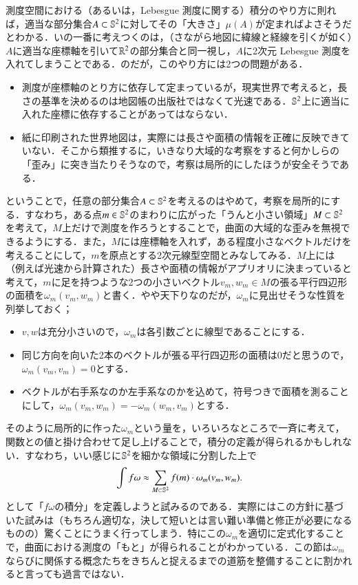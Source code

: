 測度空間における（あるいは，Lebesgue 測度に関する）積分のやり方に則れば，適当な部分集合$A \subset \mathbb{S}^2$に対してその「大きさ」$\mu(A)$が定まればよさそうだとわかる．いの一番に考えつくのは，（さながら地図に緯線と経線を引くが如く）$A$に適当な座標軸を引いて$\mathbb{R}^2$の部分集合と同一視し，$A$に2次元 Lebesgue 測度を入れてしまうことである．のだが，このやり方には2つの問題がある．
\begin{itemize}
\item 測度が座標軸のとり方に依存して定まっているが，現実世界で考えると，長さの基準を決めるのは地図帳の出版社ではなくて光速である．$\mathbb{S}^2$上に適当に入れた座標に依存することがあってはならない．
\item 紙に印刷された世界地図は，実際には長さや面積の情報を正確に反映できていない．そこから類推するに，いきなり大域的な考察をすると何かしらの「歪み」に突き当たりそうなので，考察は局所的にしたほうが安全そうである．
\end{itemize}
ということで，任意の部分集合$A \subset \mathbb{S}^2$を考えるのはやめて，考察を局所的にする．すなわち，ある点$m \in \mathbb{S}^2$のまわりに広がった「うんと小さい領域」$M \subset \mathbb{S}^2$を考えて，$M$上だけで測度を作ろうとすることで，曲面の大域的な歪みを無視できるようにする．また，$M$には座標軸を入れず，ある程度小さなベクトルだけを考えることにして，$m$を原点とする2次元線型空間とみなしてみる．$M$上には（例えば光速から計算された）長さや面積の情報がアプリオリに決まっていると考えて，$m$に足を持つような2つの小さいベクトル$v_m, w_m \in M$の張る平行四辺形の面積を$\omega_m(v_m,w_m)$と書く．やや天下りなのだが，$\omega_m$に見出せそうな性質を列挙しておく；
\begin{itemize}
\item $v,w$は充分小さいので，$\omega_m$は各引数ごとに線型であることにする．
\item 同じ方向を向いた2本のベクトルが張る平行四辺形の面積は0だと思うので，$\omega_m(v_m,v_m) = 0$とする．
\item ベクトルが右手系なのか左手系なのかを込めて，符号つきで面積を測ることにして，$\omega_m(v_m,w_m) = - \omega_m(w_m,v_m)$とする．
\end{itemize}
そのように局所的に作った$\omega_m$という量を，いろいろなところで一斉に考えて，関数との値と掛け合わせて足し上げることで，積分の定義が得られるかもしれない．すなわち，いい感じに$\mathbb{S}^2$を細かな領域に分割した上で
\begin{equation}
\int f \omega \approx \sum_{M \subset \mathbb{S}^2} f(m) \cdot \omega_m(v_m, w_m).
\end{equation}として「$f \omega$の積分」を定義しようと試みるのである．実際にはこの方針に基づいた試みは（もちろん適切な，決して短いとは言い難い準備と修正が必要になるものの）驚くことにうまく行ってしまう．特にこの$\omega_m$を適切に定式化することで，曲面における測度の「もと」が得られることがわかっている．この節は$\omega_m$ならびに関係する概念たちをきちんと捉えるまでの道筋を整備することに割かれると言っても過言ではない．

